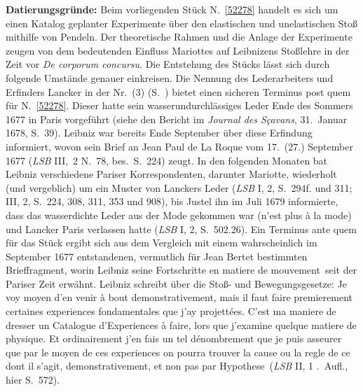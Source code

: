 \begin{ledgroup}
\footnotesize
\pstart
\noindent%
\textbf{Datierungsgründe:}
Beim vorliegenden Stück N.~\ref{52278} handelt es sich um einen Katalog geplanter Experimente über den elastischen und unelastischen Stoß mithilfe von Pendeln.
%
Der theoretische Rahmen und die Anlage der Experimente zeugen von dem bedeutenden Einfluss 
\protect{}%
Mariottes
auf Leibnizens Stoßlehre in der Zeit vor \textit{De corporum concursu}.
%
Die Entstehung des Stücks lässt sich durch folgende Umstände genauer einkreisen.%
\pend
%
\pstart
Die Nennung des Lederarbeiters und Erfinders 
\protect{}Lancker in der Nr.\ (3) 
%
(S.~)
bietet einen sicheren Terminus post quem für N.~\ref{52278}.
%
Dieser hatte sein wasserundurchlässiges Leder Ende des Sommers 1677 in 
%
Paris\protect{} vorgeführt 
%
(siehe den \cite{02048}Bericht im \cite{00157}\textit{Journal des Sçavans}, 31.\ Januar 1678, S.~39).
%
Leibniz war bereits Ende September über diese Erfindung informiert, wovon sein \cite{02049}Brief an Jean Paul de La Roque vom 17.\ (27.) September 1677 (\textit{LSB} III,~2 N.~78, bes.\ S.~224) zeugt.
%
In den folgenden Monaten bat Leibniz verschiedene Pariser Korrespondenten, darunter
%
\protect{}%
Mariotte, wiederholt (und vergeblich) um ein Muster von 
\protect{}Lanckers Leder
%
(\textit{LSB} I, 2, S.~294f. und 311; III, 2, S.~224, 308, 311, 353 und 908),
%
bis 
\protect{}Justel 
%
ihn im Juli 1679 \cite{02050}informierte, dass das wasserdichte Leder aus der Mode gekommen war
%
(\glqq n'est plus à la mode\grqq) und 
%
\protect{}Lancker 
%
\protect{}Paris verlassen hatte (\textit{LSB} I, 2, S.~502.26).
%
\pend
%
\pstart
%
Ein Terminus ante quem für das Stück ergibt sich aus dem Vergleich mit einem 
%
wahrscheinlich im September 1677 entstandenen, vermutlich für \protect{}Jean Bertet bestimmten
%
\cite{02047}Brieffragment,	
%
worin Leibniz seine Fortschritte \glqq en matiere de mouvement\grqq\ seit der Pariser Zeit erwähnt.
%
Leibniz schreibt über die Stoß- und Bewegungsgesetze:
%
\glqq Je voy moyen d’en venir à bout demonstrativement, mais il faut faire premierement certaines experiences fondamentales que j’ay projettées. C’est ma maniere de dresser un Catalogue d’Experiences à faire, lors que j’examine quelque matiere de physique. Et ordinairement j’en fais un tel dénombrement que je puis asseurer que par le moyen de ces experiences on pourra trouver la cause ou la regle de ce dont il s’agit, demonstrativement, et non pas par Hypothese\grqq\ (\textit{LSB} II, 1 .\ Aufl.\rbrack, hier S.~572).

\end{ledgroup}
